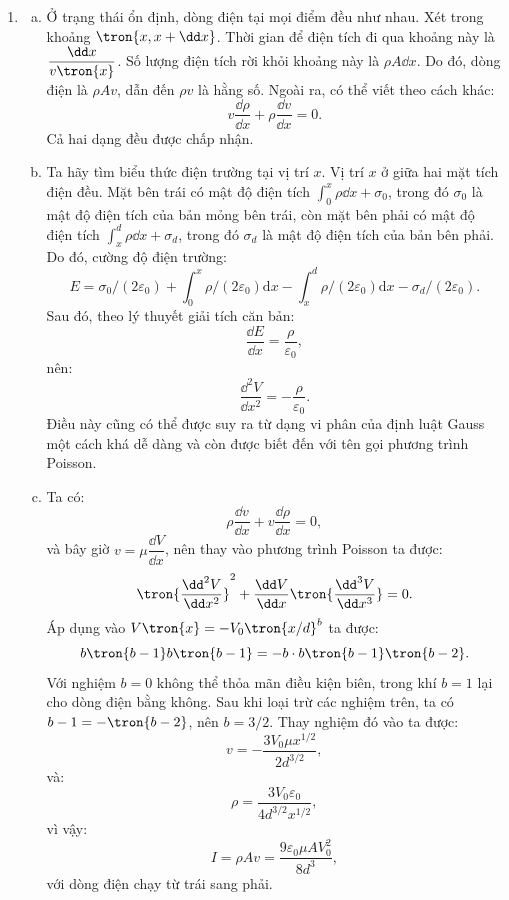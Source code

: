 \begin{loigiai}
\begin{enumerate}[1)]
    \item 
    \begin{enumerate}[a)]
        \item Ở trạng thái ổn định, dòng điện tại mọi điểm đều như nhau. Xét trong khoảng $\tron{x,x+\dd x}$. Thời gian để điện tích đi qua khoảng này là $\dfrac{\dd x}{v\tron{x}}$. Số lượng điện tích rời khỏi khoảng này là $\rho A\dd x$. Do đó, dòng điện là $\rho Av$, dẫn đến $\rho v$ là hằng số. Ngoài ra, có thể viết theo cách khác:
        $$v\dfrac{\dd \rho}{\dd x}+\rho\dfrac{\dd v}{\dd x}=0.$$
        Cả hai dạng đều được chấp nhận.
        \item Ta hãy tìm biểu thức điện trường tại vị trí $x$. Vị trí $x$ ở giữa hai mặt tích điện đều. Mặt bên trái có mật độ điện tích $\int_0^x\rho\dd x+\sigma_0$, trong đó $\sigma_0$ là mật độ điện tích của bản mỏng bên trái, còn mặt bên phải có mật độ điện tích $\int_x^d\rho\dd x+\sigma_d$, trong đó $\sigma_d$ là mật độ điện tích của bản bên phải. Do đó, cường độ điện trường:
        $$ E=\sigma_{0} /\left(2 \varepsilon_{0}\right)+\int_{0}^{x} \rho /\left(2 \varepsilon_{0}\right) \mathrm{d} x-\int_{x}^{d} \rho /\left(2 \varepsilon_{0}\right) \mathrm{d} x-\sigma_{d} /\left(2 \varepsilon_{0}\right). $$
        Sau đó, theo lý thuyết giải tích căn bản:
        $$\dfrac{\dd E}{\dd x}=\dfrac{\rho}{\varepsilon_0},$$
        nên:
        $$\dfrac{\dd^2V}{\dd x^2}=-\dfrac{\rho}{\varepsilon_0}.$$
        Điều này cũng có thể được suy ra từ dạng vi phân của định luật Gauss một cách khá dễ dàng và còn được biết đến với tên gọi phương trình Poisson.
        \item Ta có:
        $$\rho\dfrac{\dd v}{\dd x}+v\dfrac{\dd \rho}{\dd x}=0,$$
        và bây giờ $v=\mu\dfrac{\dd V}{\dd x}$, nên thay vào phương trình Poisson ta được:
        $$\tron{\dfrac{\dd^2V}{\dd x^2}}^2+\dfrac{\dd V}{\dd x}\tron{\dfrac{\dd^3 V}{\dd x^3}}=0.$$
        Áp dụng vào $V\tron{x}=-V_0\tron{x/d}^b$ ta được:
        $$b\tron{b-1}b\tron{b-1}=-b\cdot b\tron{b-1}\tron{b-2}.$$
        Với nghiệm $b=0$ không thể thỏa mãn điều kiện biên, trong khí $b=1$ lại cho dòng điện bằng không. Sau khi loại trừ các nghiệm trên, ta có $b-1=-\tron{b-2}$, nên $b=3/2$.
        Thay nghiệm đó vào ta được:
        $$v=-\dfrac{3V_0\mu x^{1/2}}{2d^{3/2}},$$
        và:
        $$\rho=\dfrac{3V_0\varepsilon_0}{4d^{3/2}x^{1/2}},$$
        vì vậy:
        $$I=\rho Av=\dfrac{9\varepsilon_0\mu AV_0^2}{8d^3},$$
        với dòng điện chạy từ trái sang phải.

\end{enumerate}
\end{enumerate}
\end{loigiai}
